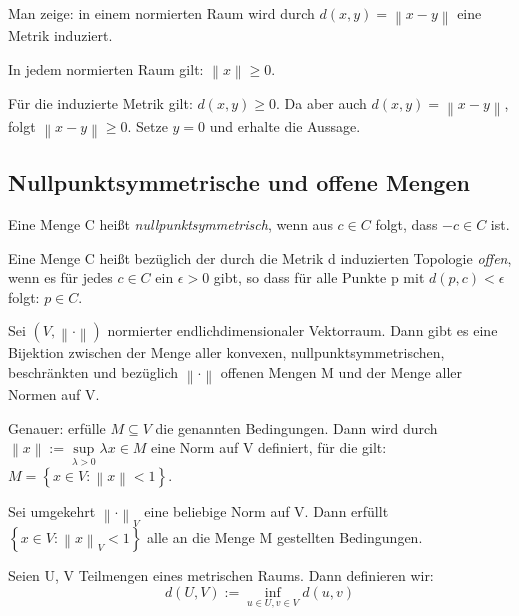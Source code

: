 \documentclass[10pt]{scrbook}
\begin{document}
\begin{Auf}
Man zeige: in einem normierten Raum wird durch $d(x, y)=\left\|x-y\right\|$ eine Metrik induziert.
\end{Auf}

\begin{Le}
In jedem normierten Raum gilt: $\left\|x\right\|\geq 0$.
\end{Le}
\begin{bew}
Für die induzierte Metrik gilt: $d(x, y)\geq 0$. Da aber auch $d(x, y)=\left\|x-y\right\|$, folgt $\left\|x-y\right\|\geq 0$. Setze $y=0$ und erhalte die Aussage.
\end{bew}

\subsection{Nullpunktsymmetrische und offene Mengen}

\begin{Def}
Eine Menge C heißt \emph{nullpunktsymmetrisch}, wenn aus $c\in C$ folgt, dass $-c\in C$ ist.
\end{Def}

\begin{Def}
Eine Menge C heißt bezüglich der durch die Metrik d induzierten Topologie \emph{offen}, wenn es für jedes $c\in C$ ein $\epsilon>0$ gibt, so dass für alle Punkte p mit $d(p, c)<\epsilon$ folgt: $p\in C$.
\end{Def}

\begin{Sa}
Sei $(V, \left\|\cdot\right\|)$ normierter endlichdimensionaler Vektorraum. Dann gibt es eine Bijektion zwischen der Menge aller konvexen, nullpunktsymmetrischen, beschränkten und bezüglich $\left\|\cdot\right\|$ offenen Mengen M und der Menge aller Normen auf V.

Genauer: erfülle $M\subseteq V$ die genannten Bedingungen. Dann wird durch $\left\|x\right\|:=\sup\limits_{\lambda>0} \lambda x\in M$ eine Norm auf V definiert, für die gilt: $M=\left\{x\in V: \left\|x\right\|<1\right\}$.

Sei umgekehrt $\left\|\cdot\right\|_V$ eine beliebige Norm auf V. Dann erfüllt $\left\{x\in V: \left\|x\right\|_V<1\right\}$ alle an die Menge M gestellten Bedingungen.
\end{Sa}

\begin{Def}
Seien U, V Teilmengen eines metrischen Raums. Dann definieren wir:
\begin{displaymath}
	d(U, V):=\inf\limits_{u\in U, v\in V}{d(u, v)}
\end{displaymath}

\end{Def}
\end{document}
